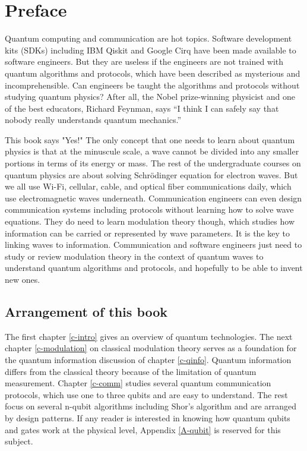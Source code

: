 \documentclass[oneside, letter, 12pt]{book}
\begin{document}



\chapter*{Preface}
Quantum computing and communication are hot topics. Software development kits (SDKs) including IBM Qiskit and Google Cirq have been made available to software engineers. But they are useless if the engineers are not trained with quantum algorithms and protocols, which have been described as mysterious and incomprehensible. Can engineers be taught the algorithms and protocols without studying quantum physics? After all, the Nobel prize-winning physicist and one of the best educators, Richard Feynman, says “I think I can safely say that nobody really understands quantum mechanics.”

This book says "Yes!" The only concept that one needs to learn about quantum physics is that at the minuscule scale, a wave cannot be divided into any smaller portions in terms of its energy or mass. The rest of the undergraduate courses on quantum physics are about solving Schrödinger equation for electron waves. But we all use Wi-Fi, cellular, cable, and optical fiber communications daily, which use electromagnetic waves underneath. Communication engineers can even design communication systems including protocols without learning how to solve wave equations. They do need to learn modulation theory though, which studies how information can be carried or represented by wave parameters. It is the key to linking waves to information. Communication and software engineers just need to study or review modulation theory in the context of quantum waves to understand quantum algorithms and protocols, and hopefully to be able to invent new ones.

\section{Arrangement of this book}
The first chapter \ref{c-intro} gives an overview of quantum technologies. The next chapter \ref{c-modulation} on classical modulation theory serves as a foundation for the quantum information discussion of chapter \ref{c-qinfo}. Quantum information differs from the classical theory because of the limitation of quantum measurement. Chapter \ref{c-comm} studies several quantum communication protocols, which use one to three qubits and are easy to understand. The rest focus on several n-qubit algorithms including Shor's algorithm and are arranged by design patterns. If any reader is interested in knowing how quantum qubits and gates work at the physical level, Appendix \ref{A-qubit} is reserved for this subject.
\end{document}
